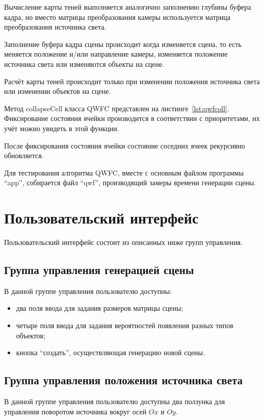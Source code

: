 Вычисление карты теней выполняется аналогично заполнению глубины буфера кадра, но вместо матрицы преобразования камеры используется матрица преобразования источника света.

Заполнение буфера кадра сцены происходит когда изменяется сцена, то есть меняется положение и/или направление камеры, изменяется положение источника света или изменяются объекты на сцене.

Расчёт карты теней происходит только при изменении положения источника света или изменении объектов на сцене.

Метод collapseCell класса QWFC представлен на листинге~\ref{lst:qwfcoll}. Фиксирование состояния ячейки производится в соответствии с приоритетами, их учёт можно увидеть в этой функции.

После фиксирования состояния ячейки состояние соседних ячеек рекурсивно обновляется.

Для тестирования алгоритма QWFC, вместе с основным файлом программы ``app'', собирается файл ``qwf'', производящий замеры времени генерации сцены.

\section*{Пользовательский интерфейс}

Пользовательский интерфейс состоит из описанных ниже групп управления.

\subsection*{Группа управления генерацией сцены}

В данной группе управления пользователю доступны:
\begin{itemize}
  \item два поля ввода для задания размеров матрицы сцены;
  \item четыре поля ввода для задания вероятностей появления разных типов объектов;
  \item кнопка ``создать'', осуществляющая генерацию новой сцены.
\end{itemize}

\subsection*{Группа управления положения источника света}

В данной группе управления пользователю доступны два ползунка для управления поворотом источника вокруг осей $Ox$ и $Oy$.

